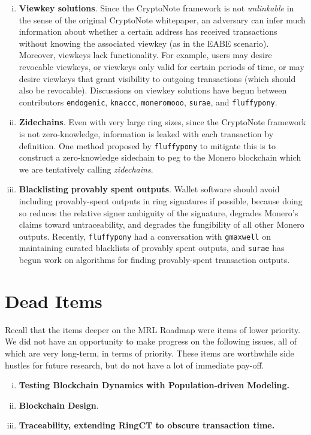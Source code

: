 \documentclass[12pt,english]{mrl}
\theoremstyle{definition}
\numberwithin{equation}{section}
\numberwithin{figure}{section}
\numberwithin{equation}{section}
\numberwithin{equation}{section}
\numberwithin{figure}{section}
\begin{document}
\begin{enumerate}[i.]
\item \textbf{Viewkey solutions}. Since the CryptoNote framework is not \emph{unlinkable} in the sense of the original CryptoNote whitepaper, an adversary can infer much information about whether a certain address has received transactions without knowing the associated viewkey (as in the EABE scenario). Moreover, viewkeys lack functionality. For example, users may desire revocable viewkeys, or viewkeys only valid for certain periods of time, or may desire viewkeys that grant visibility to outgoing transactions (which should also be revocable). Discussions on viewkey solutions have begun between contributors \texttt{endogenic}, \texttt{knaccc}, \texttt{moneromooo}, \texttt{surae}, and  \texttt{fluffypony}.

\item \textbf{Zidechains}. Even with very large ring sizes, since the CryptoNote framework is not zero-knowledge, information is leaked with each transaction by definition. One method proposed by \texttt{fluffypony} to mitigate this is to construct a zero-knowledge sidechain to peg to the Monero blockchain which we are tentatively calling \textit{zidechains}.

\item \textbf{Blacklisting provably spent outputs}. Wallet software should avoid including provably-spent outputs in ring signatures if possible, because doing so reduces the relative signer ambiguity of the signature, degrades Monero's claims toward untraceability, and degrades the fungibility of all other Monero outputs. Recently, \texttt{fluffypony} had a conversation with \texttt{gmaxwell} on maintaining curated blacklists of provably spent outputs, and \texttt{surae} has begun work on algorithms for finding provably-spent transaction outputs.
\end{enumerate}


\section{Dead Items}

Recall that the items deeper on the MRL Roadmap were items of lower priority. We did not have an opportunity to make progress on the following issues, all of which are very long-term, in terms of priority. These items are worthwhile side hustles for future research, but do not have a lot of immediate pay-off.

\begin{enumerate}[i.]
    \item \textbf{Testing Blockchain Dynamics with Population-driven Modeling.} 
    
    \item \textbf{Blockchain Design}.
    
    \item \textbf{Traceability, extending RingCT to obscure transaction time.}
\end{enumerate}
\end{document}

